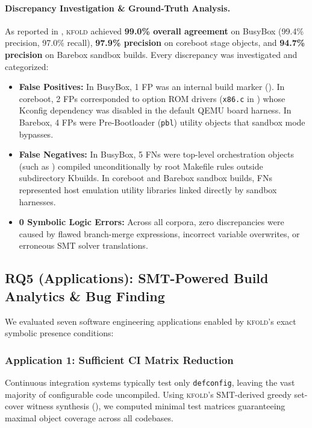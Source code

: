 \documentclass[acmsmall,screen,review]{acmart}
\newcommand{\tool}{\textsc{kfold}\xspace}
\begin{document}
\paragraph{Discrepancy Investigation \& Ground-Truth Analysis.}
As reported in , \tool achieved \textbf{99.0\% overall agreement} on BusyBox (99.4\% precision, 97.0\% recall), \textbf{97.9\% precision} on coreboot stage objects, and \textbf{94.7\% precision} on Barebox sandbox builds. Every discrepancy was investigated and categorized:
\begin{itemize}
\item \textbf{False Positives:} In BusyBox, 1 FP was an internal build marker (). In coreboot, 2 FPs corresponded to option ROM drivers (\texttt{x86.c} in ) whose Kconfig dependency was disabled in the default QEMU board harness. In Barebox, 4 FPs were Pre-Bootloader (\texttt{pbl}) utility objects that sandbox mode bypasses.
\item \textbf{False Negatives:} In BusyBox, 5 FNs were top-level orchestration objects (such as ) compiled unconditionally by root Makefile rules outside subdirectory Kbuilds. In coreboot and Barebox sandbox builds, FNs represented host emulation utility libraries linked directly by sandbox harnesses.
\item \textbf{0 Symbolic Logic Errors:} Across all corpora, zero discrepancies were caused by flawed branch-merge expressions, incorrect variable overwrites, or erroneous SMT solver translations.
\end{itemize}

\subsection{RQ5 (Applications): SMT-Powered Build Analytics \& Bug Finding}
\label{sec:eval:apps}

We evaluated seven software engineering applications enabled by \tool's exact symbolic presence conditions:

\subsubsection{Application 1: Sufficient CI Matrix Reduction}
Continuous integration systems typically test only \texttt{defconfig}, leaving the vast majority of configurable code uncompiled. Using \tool's SMT-derived greedy set-cover witness synthesis (), we computed minimal test matrices guaranteeing maximal object coverage across all codebases.
\end{document}
